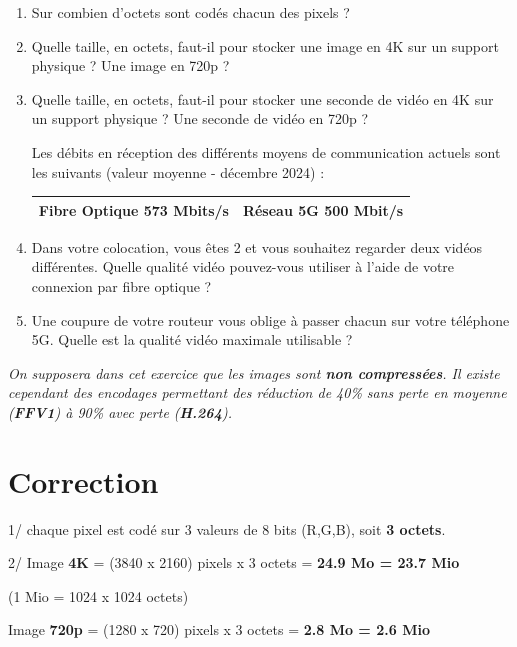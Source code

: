 \documentclass[10pt]{article} %
\begin{document}
\begin{enumerate}
	\item Sur combien d'octets sont codés chacun des pixels ?
	\item Quelle taille, en octets, faut-il pour stocker une image en 4K sur un support physique ? Une image en 720p ?
	\item Quelle taille, en octets, faut-il pour stocker une seconde de vidéo en 4K sur un support physique ? Une seconde de vidéo en 720p ?
	
	\bigskip
	
	Les débits en réception des différents moyens de communication actuels sont les suivants (valeur moyenne - décembre 2024) :

\begin{center}
\begin{tabular}{|c|c|}
\hline
\textbf{ Fibre Optique}  573 Mbits/s & 
\textbf{ Réseau 5G}  500 Mbit/s \\
\hline
\end{tabular}
\end{center}

	\medskip
	
	\item Dans votre colocation, vous êtes 2 et vous souhaitez regarder deux vidéos différentes. Quelle qualité vidéo pouvez-vous utiliser à l'aide de votre connexion par fibre optique ?
	\item Une coupure de votre routeur vous oblige à passer chacun sur votre téléphone 5G. Quelle est la qualité vidéo maximale utilisable ?
\end{enumerate}

\textit{On supposera dans cet exercice que les images sont \textbf{non compressées}. Il existe cependant des encodages permettant des réduction de 40\% sans perte en moyenne (\textbf{FFV1}) à 90\% avec perte (\textbf{H.264}).}


\section*{Correction}

1/ chaque pixel est codé sur 3 valeurs de 8 bits (R,G,B), soit \textbf{3 octets}.

\medskip

2/ Image \textbf{4K} = (3840 x 2160) pixels x 3 octets = \textbf{24.9 Mo = 23.7 Mio} 

(1 Mio = 1024 x 1024 octets)

Image \textbf{720p} = (1280 x 720) pixels x 3 octets = \textbf{2.8 Mo = 2.6 Mio}
\end{document}
